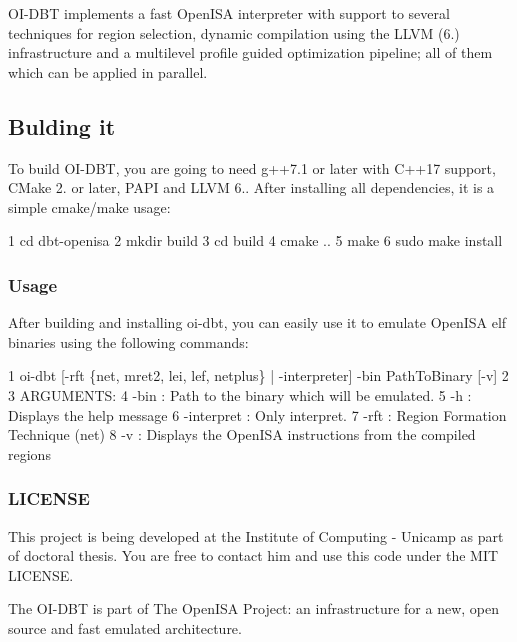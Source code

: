 O\+I-\/\+D\+BT implements a fast Open\+I\+SA interpreter with support to several techniques for region selection, dynamic compilation using the L\+L\+VM (6.) infrastructure and a multilevel profile guided optimization pipeline; all of them which can be applied in parallel.

\subsection*{Bulding it}

To build O\+I-\/\+D\+BT, you are going to need g++7.1 or later with C++17 support, C\+Make 2. or later, P\+A\+PI and L\+L\+VM 6.. After installing all dependencies, it is a simple cmake/make usage\+:


\begin{DoxyCode}
1 cd dbt-openisa
2 mkdir build
3 cd build
4 cmake ..
5 make
6 sudo make install
\end{DoxyCode}


\subsubsection*{Usage}

After building and installing oi-\/dbt, you can easily use it to emulate Open\+I\+SA elf binaries using the following commands\+:


\begin{DoxyCode}
1 oi-dbt [-rft \{net, mret2, lei, lef, netplus\} | -interpreter] -bin PathToBinary [-v]
2 
3 ARGUMENTS:
4   -bin : Path to the binary which will be emulated.
5   -h : Displays the help message
6   -interpret : Only interpret.
7   -rft : Region Formation Technique (net)
8   -v : Displays the OpenISA instructions from the compiled regions
\end{DoxyCode}


\subsubsection*{L\+I\+C\+E\+N\+SE}

This project is being developed at the Institute of Computing -\/ Unicamp as part of  doctoral thesis. You are free to contact him and use this code under the M\+IT L\+I\+C\+E\+N\+SE.

The O\+I-\/\+D\+BT is part of The Open\+I\+SA Project\+: an infrastructure for a new, open source and fast emulated architecture. 